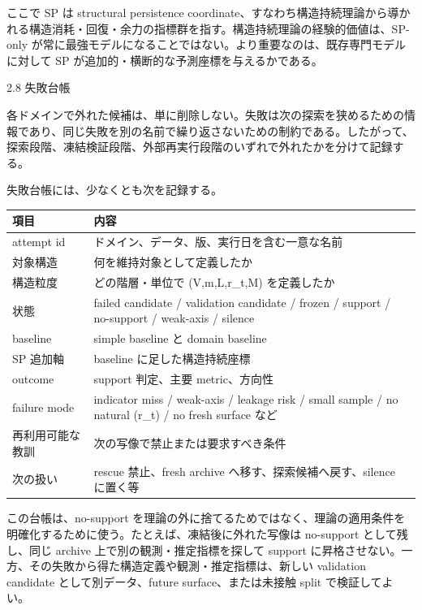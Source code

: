 \documentclass[12pt,a4paper]{article}
\begin{document}
ここで SP は structural persistence coordinate、すなわち構造持続理論から導かれる構造消耗・回復・余力の指標群を指す。構造持続理論の経験的価値は、SP-only が常に最強モデルになることではない。より重要なのは、既存専門モデルに対して SP が追加的・横断的な予測座標を与えるかである。

2.8 失敗台帳

各ドメインで外れた候補は、単に削除しない。失敗は次の探索を狭めるための情報であり、同じ失敗を別の名前で繰り返さないための制約である。したがって、探索段階、凍結検証段階、外部再実行段階のいずれで外れたかを分けて記録する。

失敗台帳には、少なくとも次を記録する。

{\def\LTcaptype{table} %
\begin{longtable}[]{@{}
  >{\raggedright\arraybackslash}p{}
  >{\raggedright\arraybackslash}p{}@{}}
\toprule\noalign{}
\begin{minipage}[b]{\linewidth}\raggedright
項目
\end{minipage} & \begin{minipage}[b]{\linewidth}\raggedright
内容
\end{minipage} \\
\midrule\noalign{}
\endhead
\bottomrule\noalign{}
\endlastfoot
attempt id & ドメイン、データ、版、実行日を含む一意な名前 \\
対象構造 & 何を維持対象として定義したか \\
構造粒度 & どの階層・単位で (V,m,L,r\_t,M) を定義したか \\
状態 & failed candidate / validation candidate / frozen / support / no-support / weak-axis / silence \\
baseline & simple baseline と domain baseline \\
SP 追加軸 & baseline に足した構造持続座標 \\
outcome & support 判定、主要 metric、方向性 \\
failure mode & indicator miss / weak-axis / leakage risk / small sample / no natural (r\_t) / no fresh surface など \\
再利用可能な教訓 & 次の写像で禁止または要求すべき条件 \\
次の扱い & rescue 禁止、fresh archive へ移す、探索候補へ戻す、silence に置く等 \\
\end{longtable}
}

この台帳は、no-support を理論の外に捨てるためではなく、理論の適用条件を明確化するために使う。たとえば、凍結後に外れた写像は no-support として残し、同じ archive 上で別の観測・推定指標を探して support に昇格させない。一方、その失敗から得た構造定義や観測・推定指標は、新しい validation candidate として別データ、future surface、または未接触 split で検証してよい。
\end{document}
